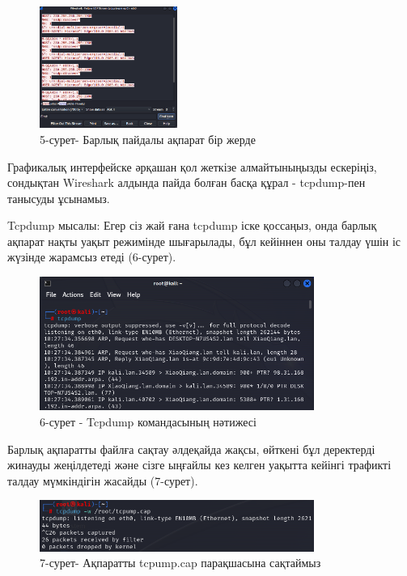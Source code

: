 \begin{figure}[H]
	\centering
	\includegraphics[width=0.4\textwidth]{assets/29}
	\caption*{5-сурет- Барлық пайдалы ақпарат бір жерде}
\end{figure}

\begin{multicols}{2}
Графикалық интерфейске әрқашан қол жеткізе алмайтыныңызды ескеріңіз,
сондықтан Wireshark алдында пайда болған басқа құрал - tcpdump-пен
танысуды ұсынамыз.

Tcpdump мысалы: Егер сіз жай ғана tcpdump іске қоссаңыз, онда барлық
ақпарат нақты уақыт режимінде шығарылады, бұл кейіннен оны талдау үшін
іс жүзінде жарамсыз етеді (6-сурет).
\end{multicols}

\begin{figure}[H]
	\centering
	\includegraphics[width=0.8\textwidth]{assets/30}
	\caption*{6-сурет - Tcpdump командасының нәтижесі}
\end{figure}

\begin{multicols}{2}
Барлық ақпаратты файлға сақтау әлдеқайда жақсы, өйткені бұл деректерді
жинауды жеңілдетеді және сізге ыңғайлы кез келген уақытта кейінгі
трафикті талдау мүмкіндігін жасайды (7-сурет).
\end{multicols}

\begin{figure}[H]
	\centering
	\includegraphics[width=0.8\textwidth]{assets/31}
	\caption*{7-сурет- Ақпаратты tcpump.cap парақшасына сақтаймыз}
\end{figure}

